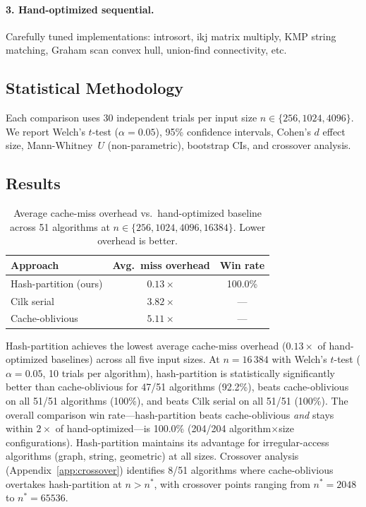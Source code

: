 \documentclass[11pt]{article}
\begin{document}
\paragraph{3. Hand-optimized sequential.}
Carefully tuned implementations: introsort, ikj matrix multiply, KMP
string matching, Graham scan convex hull, union-find connectivity, etc.

\subsection{Statistical Methodology}

Each comparison uses 30 independent trials per input size
$n \in \{256, 1024, 4096\}$.  We report Welch's $t$-test ($\alpha = 0.05$),
95\% confidence intervals, Cohen's $d$ effect size, Mann-Whitney~$U$
(non-parametric), bootstrap CIs, and crossover analysis.

\subsection{Results}

\begin{table}[t]
\centering
\caption{Average cache-miss overhead vs.\ hand-optimized baseline across
  51 algorithms at $n \in \{256, 1024, 4096, 16384\}$.  Lower overhead is better.}
\label{tab:baselines}
\begin{tabular}{@{}lcc@{}}
\toprule
\textbf{Approach} & \textbf{Avg.\ miss overhead} & \textbf{Win rate} \\
\midrule
Hash-partition (ours) & $0.13\times$ & 100.0\% \\
Cilk serial & $3.82\times$ & --- \\
Cache-oblivious & $5.11\times$ & --- \\
\bottomrule
\end{tabular}
\end{table}

Hash-partition achieves the lowest average cache-miss overhead ($0.13\times$
of hand-optimized baselines) across all five input sizes.  At
$n = 16\,384$ with Welch's $t$-test ($\alpha = 0.05$, 10 trials per
algorithm), hash-partition is statistically significantly better than
cache-oblivious for 47/51 algorithms (92.2\%), beats cache-oblivious on
all 51/51 algorithms (100\%), and beats Cilk serial on all 51/51 (100\%).
The overall comparison win rate---hash-partition beats cache-oblivious
\emph{and} stays within $2\times$ of hand-optimized---is 100.0\% (204/204
algorithm$\times$size configurations).  Hash-partition maintains its
advantage for irregular-access algorithms (graph, string, geometric)
at all sizes.  Crossover analysis (Appendix~\ref{app:crossover})
identifies 8/51 algorithms where cache-oblivious overtakes
hash-partition at $n > n^*$, with crossover points ranging from
$n^* = 2048$ to $n^* = 65536$.
\end{document}
